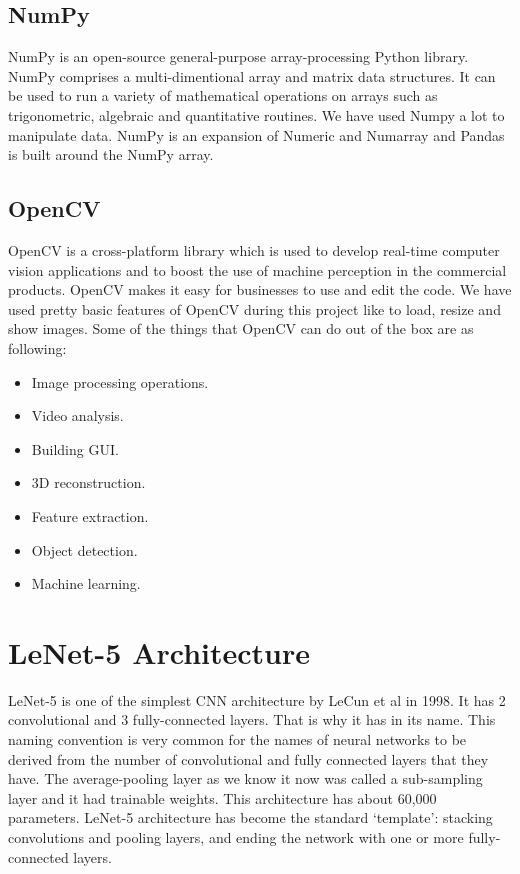 \subsection{NumPy}
NumPy\cite{numpy} is an open-source general-purpose array-processing Python library. NumPy comprises a multi-dimentional array and matrix data structures. It can be used to run a variety of mathematical operations on arrays such as trigonometric, algebraic and quantitative routines. We have used Numpy a lot to manipulate data. NumPy is an expansion of Numeric and Numarray and Pandas is built around the NumPy array.
\subsection{OpenCV}
OpenCV\cite{opencv} is a cross-platform library which is used to develop real-time computer vision applications and to boost the use of machine perception in the commercial products. OpenCV makes it easy for businesses to use and edit the code. We have used pretty basic features of OpenCV during this project like to load, resize and show images. Some of the things that OpenCV can do out of the box are as following:
\begin{itemize}
  \item Image processing operations.
  \item Video analysis.
  \item Building GUI.
  \item 3D reconstruction.
  \item Feature extraction.
  \item Object detection.
  \item Machine learning.
\end{itemize}

\section{LeNet-5 Architecture}
LeNet-5 is one of the simplest CNN architecture by LeCun et al \cite{lecun1998gradient} in 1998. It has 2 convolutional and 3 fully-connected layers. That is why it has  in its name. This naming convention is very common for the names of neural networks to be derived from the number of convolutional and fully connected layers that they have. The average-pooling layer as we know it now was called a sub-sampling layer and it had trainable weights. This architecture has about 60,000 parameters. LeNet-5 architecture has become the standard ‘template’: stacking convolutions and pooling layers, and ending the network with one or more fully-connected layers.

